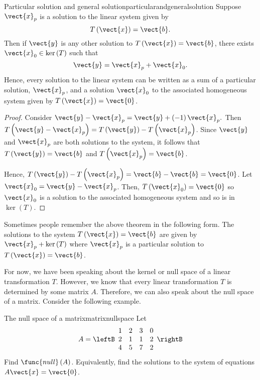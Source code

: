 \begin{theorem}{Particular solution and general solution}{particularandgeneralsolution}
Suppose $\vect{x}_{p}$ is a solution to the linear system given by
\begin{equation*}
T\left( \vect{x} \right) = \vect{b}.
\end{equation*}
Then if $\vect{y}$ is any other solution to $T\left(\vect{x}\right)=\vect{b}$, 
 there exists $\vect{x}_0 \in \ker
\left( T\right) $ such that
\begin{equation*}
\vect{y} = \vect{x}_{p}+ \vect{x}_0.
\end{equation*}
Hence, every solution to the linear system can be written as a sum of a particular solution, $\vect{x}_p$,
 and a solution $\vect{x}_0$ to the associated 
homogeneous system given by $T\left(\vect{x}\right)=\vect{0}$.
\end{theorem}

\begin{proof}
Consider $\vect{y} - \vect{x}_{p}= \vect{y} + \left(
-1\right) \vect{x}_{p}.$ Then $T\left( \vect{y} - \vect{x}_{p}\right) =T\left(\vect{y}\right)
-T\left( \vect{x}_{p} \right)$. Since $\vect{y}$ and $\vect{x}_{p}$ are both solutions to the system, it follows that $T\left(\vect{y}\right)= \vect{b} $
and $T\left(\vect{x}_p\right) = \vect{b}$. 

Hence, $T\left(\vect{y}\right)-T\left( \vect{x}_{p} \right)
=\vect{b} - \vect{b} = \vect{0}$.  Let $\vect{x}_0 = \vect{y} - \vect{x}_{p}$.
Then, $T\left(\vect{x}_0\right)= \vect{0} $ so $\vect{x}_0$ is a solution to the associated homogeneous system and so is in $\ker \left(T\right)$.
\end{proof}

Sometimes people remember the above theorem in the following form. The
solutions to the system $T\left(\vect{x}\right)=\vect{b}$ are given by 
$\vect{x}_{p}+\ker \left( T\right) $ where $\vect{x}_{p}$ is a particular
solution to $T\left(\vect{x}\right)=\vect{b}$.

For now, we have been speaking about the kernel or null space of a linear transformation $T$. However, 
we know that every linear transformation $T$ is determined by some matrix $A$. Therefore,
we can also speak about the null space of a matrix. Consider the following example.  

\begin{example}{The null space of a matrix}{matrixnullspace}
Let
\begin{equation*}
A=\leftB
\begin{array}{rrrr}
1 & 2 & 3 & 0 \\
2 & 1 & 1 & 2 \\
4 & 5 & 7 & 2
\end{array}
\rightB
\end{equation*}
Find $\func{null} \left( A\right) $. Equivalently, find the solutions to the
system of equations $A\vect{x}=\vect{0}$.
\end{example}

